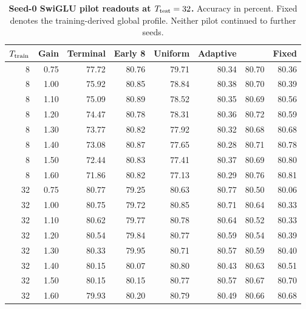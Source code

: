\begin{table}[htbp]
\centering
\caption{\textbf{Seed-0 SwiGLU pilot readouts at $T_{\rm test}=32$.} Accuracy in percent. Fixed denotes the training-derived global \grace{} profile. Neither pilot continued to further seeds.}
\label{tab:pilot_readouts}
\small
\begin{tabular}{rrrrrrrr}
\toprule
$T_{\rm train}$ & Gain & Terminal & Early 8 & Uniform & Adaptive & \grace{} & Fixed \\
\midrule
8 & 0.75 & 77.72 & 80.76 & 79.71 & 80.34 & 80.70 & 80.36 \\
8 & 1.00 & 75.92 & 80.85 & 78.84 & 80.38 & 80.70 & 80.39 \\
8 & 1.10 & 75.09 & 80.89 & 78.52 & 80.35 & 80.69 & 80.56 \\
8 & 1.20 & 74.47 & 80.78 & 78.31 & 80.36 & 80.72 & 80.59 \\
8 & 1.30 & 73.77 & 80.82 & 77.92 & 80.32 & 80.68 & 80.68 \\
8 & 1.40 & 73.08 & 80.87 & 77.65 & 80.28 & 80.71 & 80.78 \\
8 & 1.50 & 72.44 & 80.83 & 77.41 & 80.37 & 80.69 & 80.80 \\
8 & 1.60 & 71.86 & 80.82 & 77.13 & 80.29 & 80.76 & 80.81 \\
\midrule
32 & 0.75 & 80.77 & 79.25 & 80.63 & 80.77 & 80.50 & 80.06 \\
32 & 1.00 & 80.75 & 79.72 & 80.85 & 80.71 & 80.64 & 80.33 \\
32 & 1.10 & 80.62 & 79.77 & 80.78 & 80.64 & 80.52 & 80.33 \\
32 & 1.20 & 80.54 & 79.84 & 80.77 & 80.59 & 80.54 & 80.39 \\
32 & 1.30 & 80.33 & 79.95 & 80.71 & 80.57 & 80.59 & 80.40 \\
32 & 1.40 & 80.15 & 80.07 & 80.80 & 80.43 & 80.63 & 80.51 \\
32 & 1.50 & 80.15 & 80.15 & 80.77 & 80.57 & 80.67 & 80.70 \\
32 & 1.60 & 79.93 & 80.20 & 80.79 & 80.49 & 80.66 & 80.68 \\
\bottomrule
\end{tabular}
\end{table}
